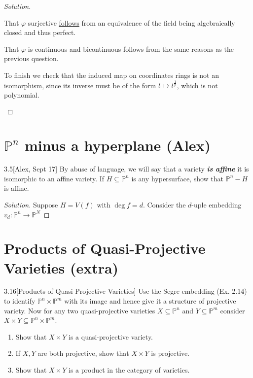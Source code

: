\begin{proof}[Solution]
\begin{enumerate}[label=\alph*.]
	That $\varphi$ surjective \href{https://en.wikipedia.org/wiki/Perfect_field}{follows} from an equivalence of the field being algebraically closed and thus perfect.

	That $\varphi$ is continuous and bicontinuous follows from the same reasons as the previous question.

	To finish we check that the induced map on coordinates rings is not an isomorphism, since its inverse must be of the form $t\mapsto t^{\frac{1}{p}}$, which is not polynomial.

\end{enumerate}
\end{proof}

\section{$\mathbb{P}^n$ minus a hyperplane (Alex)}

\begin{manualexercise}{3.5}[Alex, Sept 17]
	By abuse of language, we will say that a variety \textit{\textbf{is affine}} it is isomorphic to an affine variety. If $H\subseteq \mathbb{P}^n$ is any hypersurface, show that $\mathbb{P}^n-H$ is affine.
\end{manualexercise}

\begin{proof}[Solution]\leavevmode
	Suppose $H=V(f)$ with  $\operatorname{deg}f=d$. Consider the $d$-uple embedding $v_d:\mathbb{P}^n\to \mathbb{P}^N$
\end{proof}

\section{Products of Quasi-Projective Varieties (extra)}

\begin{manualexercise}{3.16}[Products of Quasi-Projective Varieties]
	Use the Segre embedding (Ex. 2.14) to identify $\mathbb{P}^n\times\mathbb{P}^m$ with its image and hence give it a structure of projective variety. Now for any two quasi-projective varieties $X\subseteq\mathbb{P}^n$ and $Y\subseteq\mathbb{P}^m$ consider $X\times Y\subseteq\mathbb{P}^n\times\mathbb{P}^m$.
	\begin{enumerate}[label*=(\alph*)]
		\item Show that $X\times Y$ is a quasi-projective variety.
		\item If $X,Y$ are both projective, show that $X\times Y$ is projective.
		\item Show that $X\times Y$ is a product in the category of varieties.
	\end{enumerate}
\end{manualexercise}

